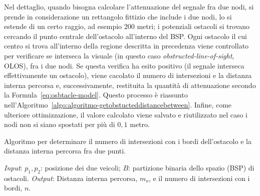 Nel dettaglio, quando bisogna calcolare l'attenuazione del segnale fra due nodi, si prende in considerazione un rettangolo fittizio che include i due nodi, lo si estende
di un certo raggio, ad esempio $200$ metri; i potenziali ostacoli si trovano cercando il punto centrale dell'ostacolo all'interno del BSP.
Ogni ostacolo il cui centro si trova all'interno della regione descritta in precedenza viene controllato per verificare se interseca la visuale
(in questo caso \textit{obstructed-line-of-sight}, OLOS), fra i due nodi.
Se questa verifica ha esito positivo (il segnale interseca effettivamente un ostacolo), viene cacolato il numero di intersezioni e la distanza interna percorsa e,
successivamente, restituita la quantità di attenuazione secondo la Formula~\ref{eq:osbtacle-model}.
Questo processo è riassunto nell'Algoritmo~\ref{algo:algoritmo-getobstucteddistancebetween}.
Infine, come ulteriore ottimizzazione, il valore calcolato viene salvato e riutilizzato nel caso i nodi non si siano spostati per più di $0,1$ metro.
%
\begin{italianalgorithm}[h]
\caption{Algoritmo per determinare il numero di intersezioni con i bordi dell'ostacolo e la distanza interna percorsa fra due punti.}\label{algo:algoritmo-getobstucteddistancebetween}
\begin{algorithmic}[1]
	\BState{}\emph{Input}: $p_1, p_2$: posizione dei due veicoli; $B$: partizione binaria dello spazio (BSP) di ostacoli.
	\BState{}\emph{Output}: Distanza interna percorsa, $m_o$, e il numero di intersezioni con i bordi, $n$.
			\label{algo:line:getobstucteddistancebetween-interesezione}
				\EndIf{}
			\EndFor{}
		\EndIf{}
	\EndFor{}
	\EndProcedure{}
\end{algorithmic}
\end{italianalgorithm}
%
